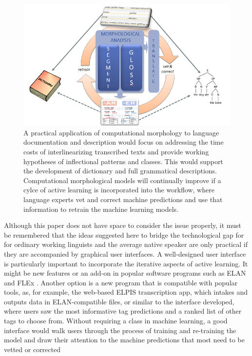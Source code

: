 \documentclass[12pt]{article}
\begin{document}
\begin{figure}[ht]
\label{fig:ML-LDD}
\begin{center}
\includegraphics[width=0.75\columnwidth]{ML-LDD.PNG}
\caption{A practical application of computational morphology to language documentation and description would focus on addressing the time costs of interlinearizing transcribed texts and provide working hypotheses of inflectional patterns and classes. This would support the development of dictionary and full grammatical descriptions. Computational morphological models will continually improve if a cylce of active learning is incorporated into the workflow, where language experts vet and correct machine predictions and use that information to retrain the machine learning models.}
\end{center}
\end{figure}

Although this paper does not have space to consider the issue properly, it must be remembered that the ideas suggested here to bridge the technological gap for for ordinary working linguists and the average native speaker are only practical if they are accompanied by graphical user interfaces. A well-designed user interface is particularly important to incorporate the iterative aspects of active learning. It might be new features or an add-on in popular software programs such as ELAN \cite{auer_elan_2010} and FLEx \cite{Black06FLEX}.  Another option is a new program that is compatible with popular tools, as, for example, the web-based ELPIS \cite{foley_elpis_2018} transcription app, which intakes and outputs data in ELAN-compatible files, or similar to the interface  developed, where users saw the most informative tag predictions and a ranked list of other tags to choose from. Without requiring a class in machine learning, a good interface would walk users through the process of training and re-training the model and draw their attention to the machine predictions that most need to be vetted or corrected
\end{document}

